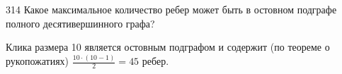 \begin{task}{314}
Какое максимальное количество ребер может быть в остовном подграфе полного десятивершинного графа?
\end{task}

\begin{solution}
Клика размера 10 является остовным подграфом и содержит (по теореме о рукопожатиях) $\frac{10\cdot(10-1)}{2}=45$ ребер.
\end{solution}